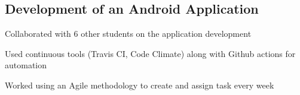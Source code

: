 \subsection{Development of an Android Application}
\begin{zitemize}
\item Collaborated with 6 other students on the application development
\item Used continuous tools (Travis CI, Code Climate) along with Github actions for automation
\item Worked using an Agile methodology to create and assign task every week
\end{zitemize}
